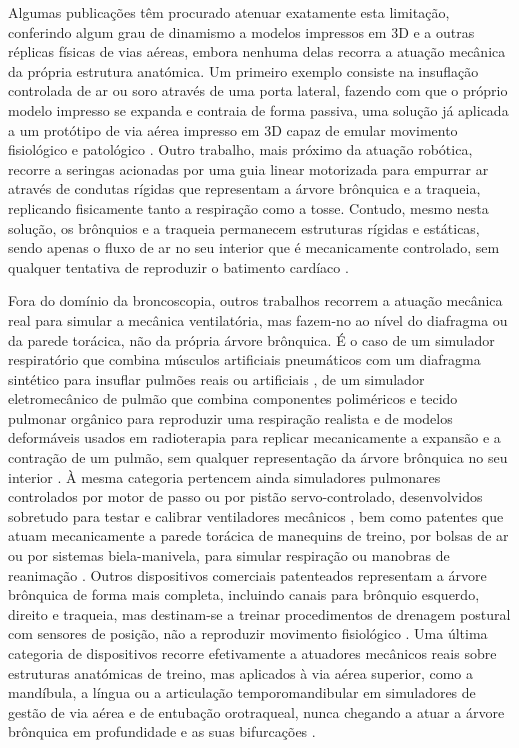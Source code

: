 Algumas publicações têm procurado atenuar exatamente esta limitação, conferindo algum grau de dinamismo a modelos impressos em 3D e a outras réplicas físicas de vias aéreas, embora nenhuma delas recorra a atuação mecânica da própria estrutura anatómica. Um primeiro exemplo consiste na insuflação controlada de ar ou soro através de uma porta lateral, fazendo com que o próprio modelo impresso se expanda e contraia de forma passiva, uma solução já aplicada a um protótipo de via aérea impresso em 3D capaz de emular movimento fisiológico e patológico \parencite{Fu2023}. Outro trabalho, mais próximo da atuação robótica, recorre a seringas acionadas por uma guia linear motorizada para empurrar ar através de condutas rígidas que representam a árvore brônquica e a traqueia, replicando fisicamente tanto a respiração como a tosse. Contudo, mesmo nesta solução, os brônquios e a traqueia permanecem estruturas rígidas e estáticas, sendo apenas o fluxo de ar no seu interior que é mecanicamente controlado, sem qualquer tentativa de reproduzir o batimento cardíaco \parencite{Giannaccini2017}.

Fora do domínio da broncoscopia, outros trabalhos recorrem a atuação mecânica real para simular a mecânica ventilatória, mas fazem-no ao nível do diafragma ou da parede torácica, não da própria árvore brônquica. É o caso de um simulador respiratório que combina músculos artificiais pneumáticos com um diafragma sintético para insuflar pulmões reais ou artificiais \parencite{Horvath2020}, de um simulador eletromecânico de pulmão que combina componentes poliméricos e tecido pulmonar orgânico para reproduzir uma respiração realista \parencite{Pare2019} e de modelos deformáveis usados em radioterapia para replicar mecanicamente a expansão e a contração de um pulmão, sem qualquer representação da árvore brônquica no seu interior \parencite{Chang2010}. À mesma categoria pertencem ainda simuladores pulmonares controlados por motor de passo ou por pistão servo-controlado, desenvolvidos sobretudo para testar e calibrar ventiladores mecânicos \parencite{Zhao2025,PatUS5975748A}, bem como patentes que atuam mecanicamente a parede torácica de manequins de treino, por bolsas de ar ou por sistemas biela-manivela, para simular respiração ou manobras de reanimação \parencite{PatCN101447141B,PatEP2430628B1}. Outros dispositivos comerciais patenteados representam a árvore brônquica de forma mais completa, incluindo canais para brônquio esquerdo, direito e traqueia, mas destinam-se a treinar procedimentos de drenagem postural com sensores de posição, não a reproduzir movimento fisiológico \parencite{PatCN107346634B}. Uma última categoria de dispositivos recorre efetivamente a atuadores mecânicos reais sobre estruturas anatómicas de treino, mas aplicados à via aérea superior, como a mandíbula, a língua ou a articulação temporomandibular em simuladores de gestão de via aérea e de entubação orotraqueal, nunca chegando a atuar a árvore brônquica em profundidade e as suas bifurcações \parencite{TakanishiWKA}.

